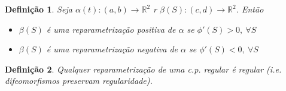 \documentclass[12pt]{article}
\newtheorem{definition}{Definição}
\begin{document}
\begin{definition}
Seja $\alpha(t): (a, b) \rightarrow \mathbb{R}^2$ r $\beta(S): (c, d) \rightarrow \mathbb{R}^2$. Então

\begin{itemize}
    \item $\beta(S)$ é uma reparametrização positiva de $\alpha$ se $\phi'(S) > 0,\ \forall S$
    \item $\beta(S)$ é uma reparametrização negativa de $\alpha$ se $\phi'(S) < 0,\ \forall S$
\end{itemize}
\end{definition}

\begin{definition}
Qualquer reparametrização de uma c.p. regular é regular (i.e. difeomorfismos preservam regularidade).
\end{definition}
\end{document}
